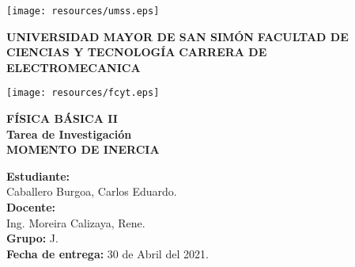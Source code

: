 \documentclass[letter,twoside,11pt]{article}
\begin{document}
\begin{titlepage}
    \begin{center}
        \begin{minipage}[]{.20\linewidth}
            \begin{flushleft}
                \texttt{[image: resources/umss.eps]}
            \end{flushleft}
        \end{minipage}
        \begin{minipage}[]{.55\linewidth}
            \centering
            \large{\textbf{UNIVERSIDAD MAYOR DE SAN SIMÓN}} \newline
            \large{\textbf{FACULTAD DE CIENCIAS Y TECNOLOGÍA}} \newline
            \large{\textbf{CARRERA DE ELECTROMECANICA}} \newline
        \end{minipage}
        \begin{minipage}[]{.20\linewidth}
            \begin{flushright}
                \texttt{[image: resources/fcyt.eps]}
            \end{flushright}
        \end{minipage}

        \vspace*{3.0cm}
        {\Large \textbf{FÍSICA BÁSICA II}}\\
        \vspace*{0.3cm}
        {\Large \textbf{Tarea de Investigación}}\\
        \vspace*{3.5cm}
        {\Large \textbf{MOMENTO DE INERCIA}}\\
    \end{center}

    \vspace*{6.5cm}
    \leftskip=7.95cm
    \noindent
    \textbf{Estudiante:}\\
    Caballero Burgoa, Carlos Eduardo.\\
    \newline
    \textbf{Docente:}\\
    Ing. Moreira Calizaya, Rene.\\
    \newline
    \textbf{Grupo:} J.\\
    \textbf{Fecha de entrega:} 30 de Abril del 2021.\\
\end{titlepage}
\end{document}
